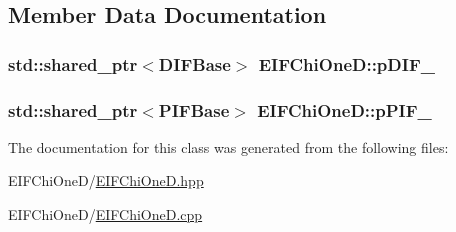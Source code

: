 \subsection{Member Data Documentation}
\hypertarget{classEIFChiOneD_a2700a77eb9736ea1468adea10acdd823}{
\subsubsection[{pDIF\_\-}]{\setlength{\rightskip}{0pt plus 5cm}std::shared\_\-ptr$<${\bf DIFBase}$>$ {\bf EIFChiOneD::pDIF\_\-}}}
\label{db/d1d/classEIFChiOneD_a2700a77eb9736ea1468adea10acdd823}
\hypertarget{classEIFChiOneD_a54b481cfd837c78597ef9a7d7a872961}{
\subsubsection[{pPIF\_\-}]{\setlength{\rightskip}{0pt plus 5cm}std::shared\_\-ptr$<${\bf PIFBase}$>$ {\bf EIFChiOneD::pPIF\_\-}}}
\label{db/d1d/classEIFChiOneD_a54b481cfd837c78597ef9a7d7a872961}


The documentation for this class was generated from the following files:\begin{DoxyCompactItemize}
\item 
EIFChiOneD/\hyperlink{EIFChiOneD_8hpp}{EIFChiOneD.hpp}\item 
EIFChiOneD/\hyperlink{EIFChiOneD_8cpp}{EIFChiOneD.cpp}\end{DoxyCompactItemize}
